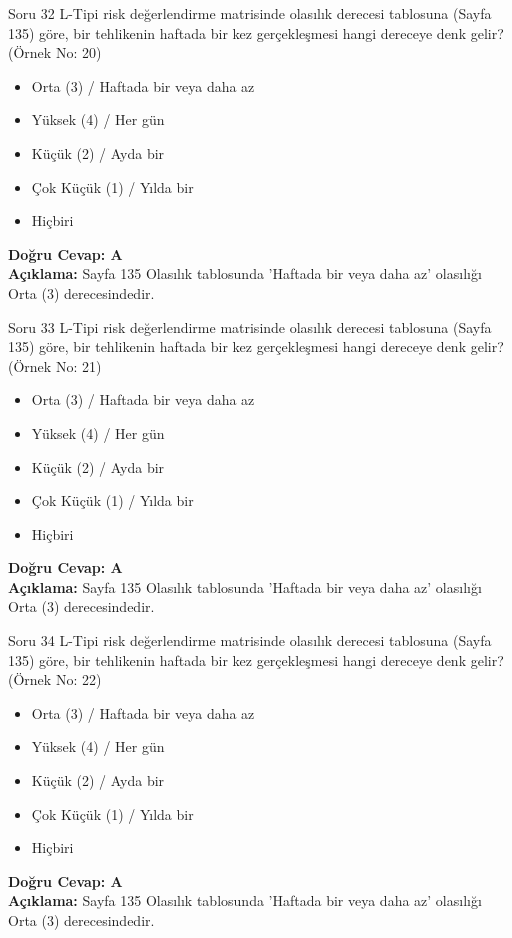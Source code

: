 \documentclass[12pt,a4paper]{article}
\begin{document}
\begin{testcard}{Soru 32}
    L-Tipi risk değerlendirme matrisinde olasılık derecesi tablosuna (Sayfa 135) göre, bir tehlikenin haftada bir kez gerçekleşmesi hangi dereceye denk gelir? (Örnek No: 20)
    \begin{itemize}
        \item[A)] Orta (3) / Haftada bir veya daha az
        \item[B)] Yüksek (4) / Her gün
        \item[C)] Küçük (2) / Ayda bir
        \item[D)] Çok Küçük (1) / Yılda bir
        \item[E)] Hiçbiri
    \end{itemize}
    \tcblower
    \textbf{Doğru Cevap: A} \\
    \textbf{Açıklama:} Sayfa 135 Olasılık tablosunda 'Haftada bir veya daha az' olasılığı Orta (3) derecesindedir.
\end{testcard}

\begin{testcard}{Soru 33}
    L-Tipi risk değerlendirme matrisinde olasılık derecesi tablosuna (Sayfa 135) göre, bir tehlikenin haftada bir kez gerçekleşmesi hangi dereceye denk gelir? (Örnek No: 21)
    \begin{itemize}
        \item[A)] Orta (3) / Haftada bir veya daha az
        \item[B)] Yüksek (4) / Her gün
        \item[C)] Küçük (2) / Ayda bir
        \item[D)] Çok Küçük (1) / Yılda bir
        \item[E)] Hiçbiri
    \end{itemize}
    \tcblower
    \textbf{Doğru Cevap: A} \\
    \textbf{Açıklama:} Sayfa 135 Olasılık tablosunda 'Haftada bir veya daha az' olasılığı Orta (3) derecesindedir.
\end{testcard}

\begin{testcard}{Soru 34}
    L-Tipi risk değerlendirme matrisinde olasılık derecesi tablosuna (Sayfa 135) göre, bir tehlikenin haftada bir kez gerçekleşmesi hangi dereceye denk gelir? (Örnek No: 22)
    \begin{itemize}
        \item[A)] Orta (3) / Haftada bir veya daha az
        \item[B)] Yüksek (4) / Her gün
        \item[C)] Küçük (2) / Ayda bir
        \item[D)] Çok Küçük (1) / Yılda bir
        \item[E)] Hiçbiri
    \end{itemize}
    \tcblower
    \textbf{Doğru Cevap: A} \\
    \textbf{Açıklama:} Sayfa 135 Olasılık tablosunda 'Haftada bir veya daha az' olasılığı Orta (3) derecesindedir.
\end{testcard}
\end{document}
